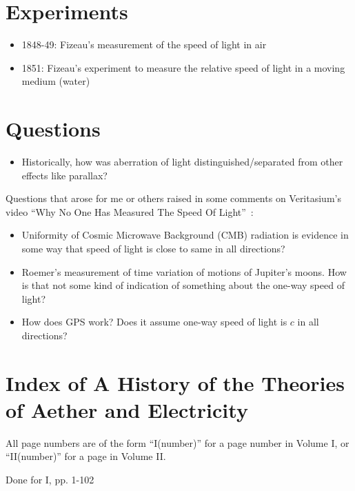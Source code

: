 \documentclass[a4paper]{article}
\theoremstyle{plain}
\theoremstyle{definition}
\begin{document}
\section{Experiments}

\begin{itemize}
\item 1848-49: Fizeau's measurement of the speed of light in
  air~\cite{Fizeau1849}
\item 1851: Fizeau's experiment to measure the relative speed of light
  in a moving medium (water)~\cite{Fizeau1851}
\end{itemize}


\section{Questions}

\begin{itemize}
\item Historically, how was aberration of light
  distinguished/separated from other effects like parallax?
\end{itemize}

Questions that arose for me or others raised in some comments on
Veritasium's video ``Why No One Has Measured The Speed Of
Light''~\cite{OneWaySpeedOfLight}:
\begin{itemize}
\item Uniformity of Cosmic Microwave Background (CMB) radiation is
  evidence in some way that speed of light is close to same in all
  directions?
\item Roemer's measurement of time variation of motions of Jupiter's
  moons.  How is that not some kind of indication of something about
  the one-way speed of light?
\item How does GPS work?  Does it assume one-way speed of light is $c$
  in all directions?
\end{itemize}


\section{Index of A History of the Theories of Aether and Electricity}

All page numbers are of the form ``I(number)'' for a page number in
Volume I, or ``II(number)'' for a page in Volume II.

Done for I, pp. 1-102
\end{document}

